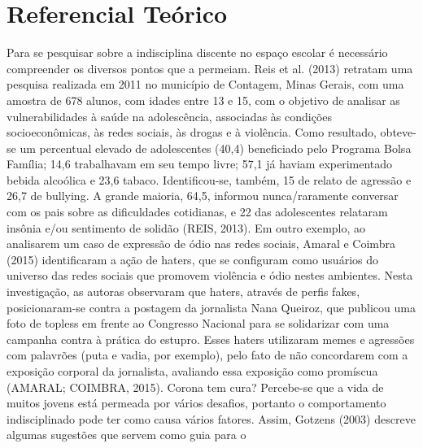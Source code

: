\section{Referencial Teórico}
Para se pesquisar sobre a indisciplina discente no
espaço escolar é necessário compreender os diversos
pontos que a permeiam.
Reis et al. (2013) retratam uma pesquisa realizada
em 2011 no município de Contagem, Minas Gerais,
com uma amostra de 678 alunos, com idades entre
13 e 15, com o objetivo de analisar as vulnerabilidades
à saúde na adolescência, associadas às condições
socioeconômicas, às redes sociais, às drogas
e à violência.
Como resultado, obteve-se um percentual elevado
de adolescentes (40,4) beneficiado pelo Programa
Bolsa Família; 14,6 trabalhavam em seu tempo livre;
57,1 já haviam experimentado bebida alcoólica e
23,6 tabaco. Identificou-se, também, 15 de relato
de agressão e 26,7 de bullying. A grande maioria,
64,5, informou nunca/raramente conversar com
os pais sobre as dificuldades cotidianas, e 22 das
adolescentes relataram insônia e/ou sentimento de
solidão (REIS, 2013).
Em outro exemplo, ao analisarem um caso
de expressão de ódio nas redes sociais, Amaral
e Coimbra (2015) identificaram a ação de haters,
que se configuram como usuários do universo das
redes sociais que promovem violência e ódio nestes
ambientes. Nesta investigação, as autoras observaram
que haters, através de perfis fakes, posicionaram-se
contra a postagem da jornalista Nana Queiroz, que
publicou uma foto de topless em frente ao Congresso
Nacional para se solidarizar com uma campanha contra
à prática do estupro. Esses haters utilizaram memes e
agressões com palavrões (puta e vadia, por exemplo),
pelo fato de não concordarem com a exposição
corporal da jornalista, avaliando essa exposição como promíscua (AMARAL; COIMBRA, 2015).
{Corona tem cura?}
Percebe-se que a vida de muitos jovens
está permeada por vários desafios, portanto o
comportamento indisciplinado pode ter como causa
vários fatores. Assim, Gotzens (2003) descreve
algumas sugestões que servem como guia para o
